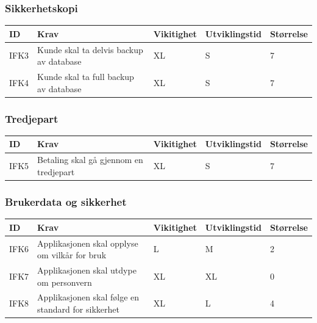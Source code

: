 \documentclass[12pt]{article}
\newcommand{\celly}{\cellcolor{yellow!25}}
\newcommand{\celll}{\cellcolor{lime!25}}
\newcommand{\cellg}{\cellcolor{green!25}}
\begin{document}
        \subsubsection{Sikkerhetskopi}

        \begin{tabular}{|p{2cm}|p{6cm}|
            >{\centering\arraybackslash}p{2cm}|
            >{\centering\arraybackslash}p{2cm}|
            >{\centering\arraybackslash}p{2cm}|}
            \hline
            \bf ID & \bf Krav & \bf Vikitighet & \bf Utviklingstid & \bf Størrelse\\
            \hline
            IFK3
            &
            Kunde skal ta delvis backup av database
            & XL & S & \cellg 7\\
            \hline
            IFK4
            &
            Kunde skal ta full backup av database
            & XL & S & \cellg 7\\
            \hline
        \end{tabular}

        \subsubsection{Tredjepart}

        \begin{tabular}{|p{2cm}|p{6cm}|
            >{\centering\arraybackslash}p{2cm}|
            >{\centering\arraybackslash}p{2cm}|
            >{\centering\arraybackslash}p{2cm}|}
            \hline
            \bf ID & \bf Krav & \bf Vikitighet & \bf Utviklingstid & \bf Størrelse\\
            \hline
            IFK5
            &
            Betaling skal gå gjennom en tredjepart
            & XL & S & \cellg 7\\
            \hline
        \end{tabular}

        \subsubsection{Brukerdata og sikkerhet}

        \begin{tabular}{|p{2cm}|p{6cm}|
            >{\centering\arraybackslash}p{2cm}|
            >{\centering\arraybackslash}p{2cm}|
            >{\centering\arraybackslash}p{2cm}|}
            \hline
            \bf ID & \bf Krav & \bf Vikitighet & \bf Utviklingstid & \bf Størrelse\\
            \hline
            IFK6
            &
            Applikasjonen skal opplyse om vilkår for bruk
            & L & M & \celll 2\\
            \hline
            IFK7
            &
            Applikasjonen skal utdype om personvern
            & XL & XL & \celly 0\\
            \hline
            IFK8
            &
            Applikasjonen skal følge en standard for sikkerhet
            & XL & L & \cellg 4\\
            \hline
        \end{tabular}
\end{document}
